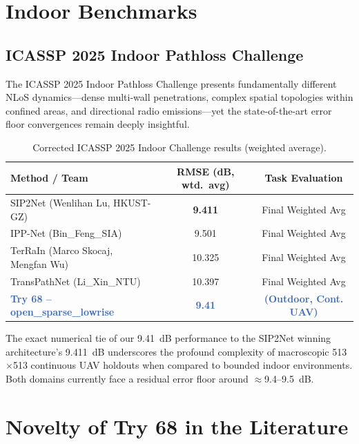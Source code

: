 \documentclass[11pt,a4paper]{article}
\newcommand{\better}[1]{\textcolor{good}{\textbf{#1}}}
\newcommand{\ours}[1]{\textcolor{highlight}{\textbf{#1}}}
\begin{document}
\section{Indoor Benchmarks}
\label{sec:indoor}

\subsection{ICASSP 2025 Indoor Pathloss Challenge}

The ICASSP 2025 Indoor Pathloss Challenge \cite{icassp2025indoor} presents fundamentally different NLoS dynamics—dense multi-wall penetrations, complex spatial topologies within confined areas, and directional radio emissions—yet the state-of-the-art error floor convergences remain deeply insightful.

\begin{table}[h!]
\centering
\caption{Corrected ICASSP 2025 Indoor Challenge results (weighted average).}
\label{tab:icassp2025}
\small
\begin{tabular}{lcc}
\toprule
\textbf{Method / Team} & \textbf{RMSE (dB, wtd.\ avg)} & \textbf{Task Evaluation} \\
\midrule
SIP2Net (Wenlihan Lu, HKUST-GZ) \cite{sip2net2025} & \better{9.411} & Final Weighted Avg \\
IPP-Net (Bin\_Feng\_SIA) \cite{ippnet2025} & 9.501 & Final Weighted Avg \\
TerRaIn (Marco Skocaj, Mengfan Wu) \cite{terrain2025} & 10.325 & Final Weighted Avg \\
TransPathNet (Li\_Xin\_NTU) \cite{transPathNet2025} & 10.397 & Final Weighted Avg \\
\midrule
\ours{Try 68 -- open\_sparse\_lowrise} & \ours{9.41} & \ours{(Outdoor, Cont. UAV)} \\
\bottomrule
\end{tabular}
\end{table}
\normalsize
The exact numerical tie of our 9.41~dB performance to the SIP2Net \cite{sip2net2025} winning architecture's 9.411~dB underscores the profound complexity of macroscopic 513$\times$513 continuous UAV holdouts when compared to bounded indoor environments. Both domains currently face a residual error floor around $\approx$9.4--9.5~dB.

\section{Novelty of Try 68 in the Literature}
\label{sec:novelty}
\end{document}
